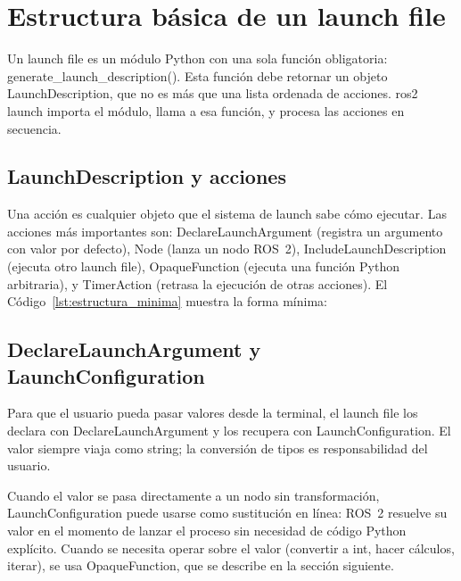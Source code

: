 \section{Estructura básica de un launch file}

Un launch file es un módulo Python con una sola función obligatoria: generate\_launch\_description(). Esta función debe retornar un objeto LaunchDescription, que no es más que una lista ordenada de acciones. ros2 launch importa el módulo, llama a esa función, y procesa las acciones en secuencia.

\subsection{LaunchDescription y acciones}

Una acción es cualquier objeto que el sistema de launch sabe cómo ejecutar. Las acciones más importantes son: DeclareLaunchArgument (registra un argumento con valor por defecto), Node (lanza un nodo ROS~2), IncludeLaunchDescription (ejecuta otro launch file), OpaqueFunction (ejecuta una función Python arbitraria), y TimerAction (retrasa la ejecución de otras acciones). El Código~\ref{lst:estructura_minima} muestra la forma mínima:



\subsection{DeclareLaunchArgument y LaunchConfiguration}

Para que el usuario pueda pasar valores desde la terminal, el launch file los declara con DeclareLaunchArgument y los recupera con LaunchConfiguration. El valor siempre viaja como string; la conversión de tipos es responsabilidad del usuario.

Cuando el valor se pasa directamente a un nodo sin transformación, LaunchConfiguration puede usarse como sustitución en línea: ROS~2 resuelve su valor en el momento de lanzar el proceso sin necesidad de código Python explícito. Cuando se necesita operar sobre el valor (convertir a int, hacer cálculos, iterar), se usa OpaqueFunction, que se describe en la sección siguiente.
